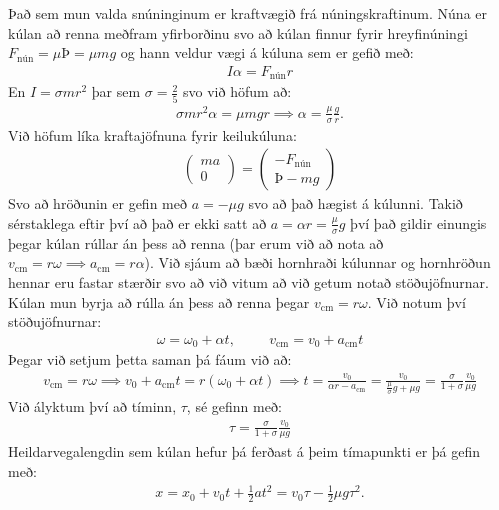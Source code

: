 Það sem mun valda snúninginum er kraftvægið frá núningskraftinum. Núna er kúlan að renna meðfram yfirborðinu svo að kúlan finnur fyrir hreyfinúningi $F_{\text{nún}} = \mu Þ = \mu mg$ og hann veldur vægi á kúluna sem er gefið með:
\begin{align*}
    I\alpha = F_{\text{nún}}r
\end{align*}
En $I = \sigma mr^2$ þar sem $\sigma = \frac{2}{5}$ svo við höfum að:
\begin{align*}
    \sigma mr^2\alpha = \mu mgr \implies \alpha = \frac{\mu}{\sigma} \frac{g}{r}.
\end{align*}
Við höfum líka kraftajöfnuna fyrir keilukúluna:
\begin{align*}
    \begin{pmatrix} ma \\ 0 \end{pmatrix} = \begin{pmatrix} -F_{\text{nún}} \\ Þ - mg \end{pmatrix}
\end{align*}
Svo að hröðunin er gefin með $a = -\mu g$ svo að það hægist á kúlunni. Takið sérstaklega eftir því að það er ekki satt að $a = \alpha r = \frac{\mu}{\sigma}g$ því það gildir einungis þegar kúlan rúllar án þess að renna (þar erum við að nota að $v_{\text{cm}} = r\omega \implies a_{\text{cm}} = r\alpha$). Við sjáum að bæði hornhraði kúlunnar og hornhröðun hennar eru fastar stærðir svo að við vitum að við getum notað stöðujöfnurnar. Kúlan mun byrja að rúlla án þess að renna þegar $v_{\text{cm}} = r\omega$. Við notum því stöðujöfnurnar:
\begin{align*}
    \omega = \omega_0 + \alpha t, \hspace{1cm} v_{\text{cm}} = v_0 + a_{\text{cm}}t
\end{align*}
Þegar við setjum þetta saman þá fáum við að:
\begin{align*}
    v_{\text{cm}} = r\omega \implies v_0 + a_{\text{cm}}t = r\left( \omega_0 +\alpha t \right) \implies t = \frac{v_0}{\alpha r - a_{\text{cm}}} = \frac{v_0}{\frac{\mu}{\sigma}g + \mu g} = \frac{\sigma}{1+\sigma}\frac{v_0}{\mu g}
\end{align*}
Við ályktum því að tíminn, $\tau$, sé gefinn með:
\begin{align*}
    \tau = \frac{\sigma}{1+\sigma}\frac{v_0}{\mu g}
\end{align*}
Heildarvegalengdin sem kúlan hefur þá ferðast á þeim tímapunkti er þá gefin með:
\begin{align*}
    x = x_0 + v_0 t + \frac{1}{2}at^2 = v_0 \tau - \frac{1}{2}\mu g \tau^2.
\end{align*}
